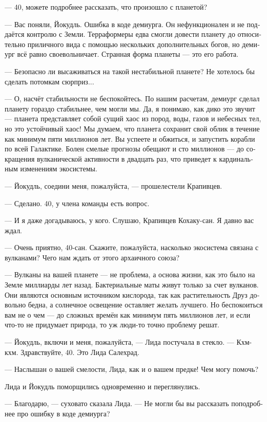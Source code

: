 \documentclass[a4paper,12pt,fleqn]{book}\usepackage{cooltooltips}\usepackage{polyglossia}\setdefaultlanguage[babelshorthands=true]{russian}\setotherlanguage{english}\defaultfontfeatures{Ligatures=TeX,Mapping=tex-text} \usepackage{xcolor}\definecolor{lightgray}{HTML}{bbbbbb}\color{lightgray}\newcommand{\ml}[3]{\textenglish{\textcolor{black}{#3}}}
\begin{document}
--- 40, можете подробнее рассказать, что произошло с планетой?

--- Вас поняли, Йокудль.
Ошибка в коде демиурга.
Он нефункционален и не поддаётся контролю с Земли.
Терраформеры едва смогли довести планету до относительно приличного вида с помощью нескольких дополнительных богов, но демиург всё равно своевольничает.
Странная форма планеты --- это его работа.

--- Безопасно ли высаживаться на такой нестабильной планете?
Не хотелось бы сделать потомкам сюрприз...

--- О, насчёт стабильности не беспокойтесь.
По нашим расчетам, демиург сделал планету гораздо стабильнее, чем могли мы.
Да, я понимаю, как дико это звучит --- планета представляет собой сущий хаос из пород, воды, газов и небесных тел, но это устойчивый хаос!
Мы думаем, что планета сохранит свой облик в течение как минимум пяти миллионов лет.
Вы успеете и обжиться, и запустить корабли по всей Галактике.
Болен смелые прогнозы обещают и сто миллионов --- до сокращения вулканической активности в двадцать раз, что приведет к кардинальным изменениям экосистемы.

--- Йокудль, соедини меня, пожалуйста, --- прошелестели Крапивцев.

--- Сделано.
40, у члена команды есть вопрос.

--- И я даже догадываюсь, у кого.
Слушаю, Крапивцев Кохаку-сан.
Я давно вас ждал.

--- Очень приятно, 40-сан.
Скажите, пожалуйста, насколько экосистема связана с вулканами?
Чего нам ждать от этого архаичного союза?

--- Вулканы на вашей планете --- не проблема, а основа жизни, как это было на Земле миллиарды лет назад.
Бактериальные маты живут только за счет вулканов.
Они являются основным источником кислорода, так как растительность Друз довольно бедна, а солнечное освещение оставляет желать лучшего.
Но беспокоиться вам не о чем --- до сложных времён как минимум пять миллионов лет, и если что-то не придумает природа, то уж люди-то точно проблему решат.

--- Йокудль, включи и меня, пожалуйста, --- Лида постучала в стекло.
--- Кхм-кхм.
Здравствуйте, 40.
Это Лида Салехрад.

--- Наслышан о вашей смелости, Лида, как и о вашем предке!
Чем могу помочь?

Лида и Йокудль поморщились одновременно и переглянулись.

--- Благодарю, --- суховато сказала Лида.
--- Не могли бы вы рассказать поподробнее про ошибку в коде демиурга?
\end{document}
